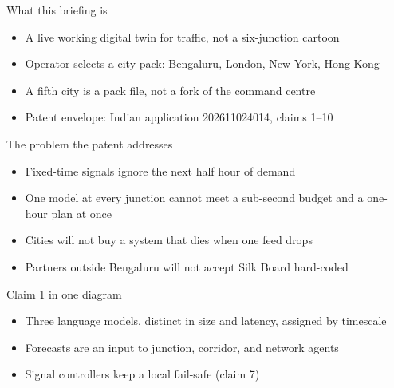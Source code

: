 \documentclass[aspectratio=169,11pt]{beamer}
\begin{document}
\titleframecsf

\begin{frame}{What this briefing is}
\begin{itemize}\itemsep0.7em
\item A live working digital twin for traffic, not a six-junction cartoon
\item Operator selects a city pack: Bengaluru, London, New York, Hong Kong
\item A fifth city is a pack file, not a fork of the command centre
\item Patent envelope: Indian application 202611024014, claims 1--10
\end{itemize}
\end{frame}


\begin{frame}{The problem the patent addresses}
\begin{itemize}\itemsep0.7em
\item Fixed-time signals ignore the next half hour of demand
\item One model at every junction cannot meet a sub-second budget and a
      one-hour plan at once
\item Cities will not buy a system that dies when one feed drops
\item Partners outside Bengaluru will not accept Silk Board hard-coded
\end{itemize}
\end{frame}

\begin{frame}{Claim 1 in one diagram}
\begin{center}\end{center}
\begin{itemize}\itemsep0.5em
\item Three language models, distinct in size and latency, assigned by timescale
\item Forecasts are an input to junction, corridor, and network agents
\item Signal controllers keep a local fail-safe (claim 7)
\end{itemize}
\end{frame}
\end{document}
